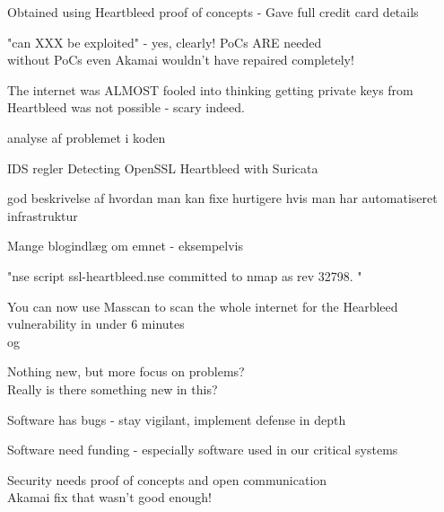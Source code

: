 \documentclass[20pt,landscape,a4paper,footrule]{foils}
\begin{document}
\begin{list2}
\item Obtained using Heartbleed proof of concepts - Gave full credit card details
\item "can XXX be exploited" - yes, clearly! PoCs ARE needed\\
without PoCs even Akamai wouldn't have repaired completely!
\item The internet was ALMOST fooled into thinking getting private keys from Heartbleed was not possible - scary indeed.
\end{list2}


\begin{list2}
\item analyse af problemet i koden\\
{\small{}} 
\item IDS regler Detecting OpenSSL Heartbleed with Suricata\\
{\small{}} 
\item god beskrivelse af hvordan man kan fixe hurtigere hvis man har automatiseret infrastruktur\\

\item Mange blogindlæg om emnet - eksempelvis\\
{\small{} }
 
\item "nse script ssl-heartbleed.nse committed to nmap as rev 32798. " 
\item You can now use Masscan to scan the whole internet for the Hearbleed vulnerability in under 6 minutes \\ og {\small{}}
\end{list2}


\begin{list1}
\item Nothing new, but more focus on problems?\\
Really is there something new in this?
\item Software has bugs - stay vigilant, implement defense in depth
\item Software need funding - especially software used in our critical systems
\item Security needs proof of concepts and open communication\\
Akamai fix that wasn't good enough!
\end{list1}
\end{document}
